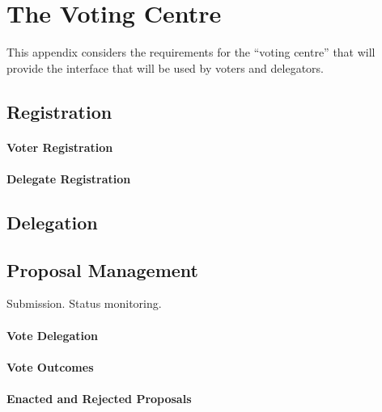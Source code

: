 \pagebreak
\section{The Voting Centre}
\label{sect:voting-centre}

This appendix considers the requirements for the ``voting centre'' that will provide the interface that will be used by voters and delegators.


\subsection{Registration}

\paragraph{Voter Registration}

\paragraph{Delegate Registration}

\subsection{Delegation}


\subsection{Proposal Management}

Submission.  Status monitoring.

\paragraph{Vote Delegation}

\paragraph{Vote Outcomes}

\paragraph{Enacted and Rejected Proposals}
